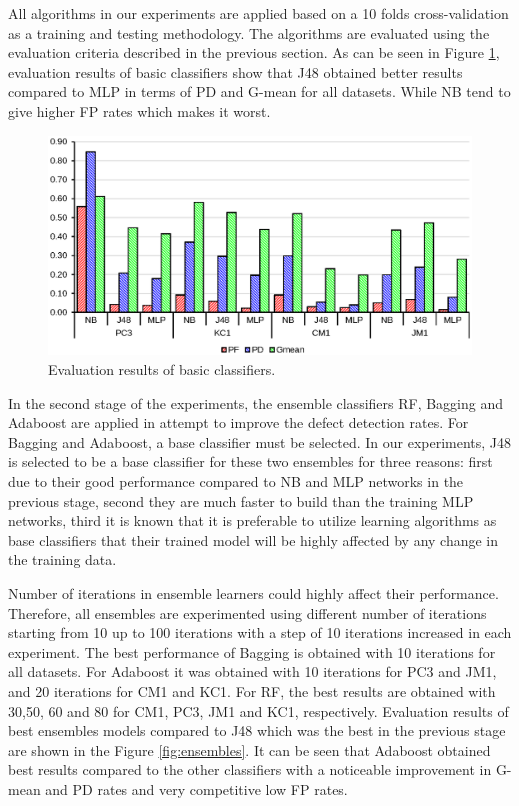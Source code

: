 \documentclass[runningheads,a4paper]{llncs}
\begin{document}
All algorithms in our experiments are applied based on a 10 folds cross-validation as a training and testing methodology. The algorithms are evaluated using the evaluation criteria described in the previous section. As can be seen in Figure  \ref{fig:basic}, evaluation results of basic classifiers show that J48 obtained better results compared to MLP in terms of PD and G-mean for all datasets. While NB tend to give higher FP rates which makes it worst. 



\begin{figure}[H]
\centering
\includegraphics[scale=0.6]{basicresults.eps}
\caption{Evaluation results of basic classifiers.}
\label{fig:basic}
\end{figure}


In the second stage of the experiments, the ensemble classifiers RF, Bagging and Adaboost are applied in attempt to improve the defect detection rates. For Bagging and Adaboost, a base classifier must be selected. In our experiments, J48 is selected to be a base classifier for these two ensembles for three reasons: first due to their good performance compared to NB and MLP networks in the previous stage, second they are much faster to build than the training MLP networks, third it is known that it is preferable to utilize learning algorithms as base classifiers that their trained model will be highly affected by any change in the training data. 

Number of iterations in ensemble learners could highly affect their performance. Therefore, all ensembles are experimented using different number of iterations starting from 10 up to 100 iterations with a step of 10 iterations increased in each experiment. The best performance of Bagging is obtained with 10 iterations for all datasets. For Adaboost it was obtained with 10 iterations for PC3 and JM1, and 20 iterations for CM1 and KC1. For RF, the best results are obtained with 30,50, 60 and 80 for CM1, PC3, JM1 and KC1, respectively. Evaluation results of best ensembles models compared to J48 which was the best in the previous stage are shown in the Figure \ref{fig:ensembles}. It can be seen that Adaboost obtained best results compared to the other classifiers with a noticeable improvement in G-mean and PD rates and very competitive low FP rates.
\end{document}
